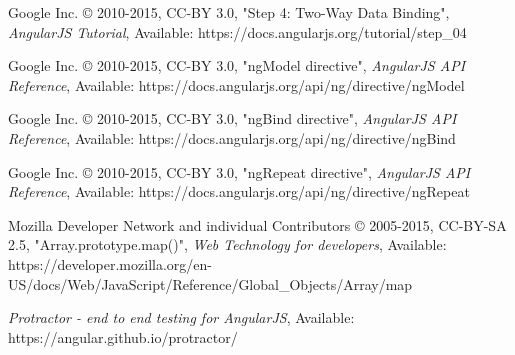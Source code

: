 \begin{thebibliography}{999}
\raggedright
Google Inc. © 2010-2015, CC-BY 3.0, "Step 4: Two-Way Data Binding",
{\em AngularJS Tutorial},
Available: https://docs.angularjs.org/tutorial/step\_04

\raggedright
Google Inc. © 2010-2015, CC-BY 3.0, "ngModel directive",
{\em AngularJS API Reference},
Available: https://docs.angularjs.org/api/ng/directive/ngModel

\raggedright
Google Inc. © 2010-2015, CC-BY 3.0, "ngBind directive",
{\em AngularJS API Reference},
Available: https://docs.angularjs.org/api/ng/directive/ngBind

\raggedright
Google Inc. © 2010-2015, CC-BY 3.0, "ngRepeat directive",
{\em AngularJS API Reference},
Available: https://docs.angularjs.org/api/ng/directive/ngRepeat

\raggedright
Mozilla Developer Network and individual Contributors © 2005-2015, CC-BY-SA 2.5, "Array.prototype.map()",
{\em Web Technology for developers},
Available: https://developer.mozilla.org/en-US/docs/Web/JavaScript/Reference/Global\_Objects/Array/map

{\em Protractor - end to end testing for AngularJS},
Available: https://angular.github.io/protractor/


\end{thebibliography}
